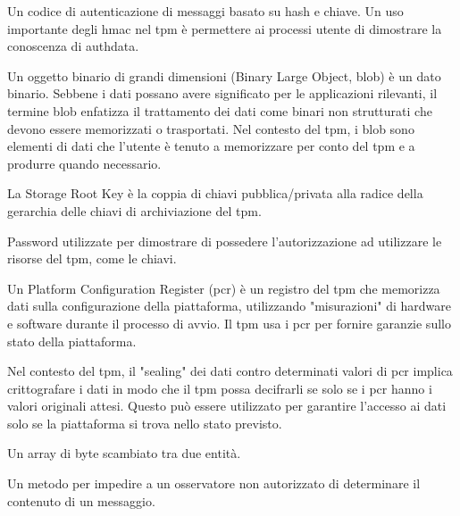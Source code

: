 \begin{description}[itemsep=2.5ex, parsep=0.5ex, leftmargin=2.5cm, style=nextline]
    \item[\textbf{\acrshort{hmac}}] Un codice di autenticazione di messaggi basato su hash e chiave. Un uso importante degli \acrshort{hmac} nel \acrshort{tpm} è permettere ai processi utente di dimostrare la conoscenza di authdata. 

    \item[\textbf{BLOB}] Un oggetto binario di grandi dimensioni (Binary Large Object, blob) è un dato binario. Sebbene i dati possano avere significato per le applicazioni rilevanti, il termine blob enfatizza il trattamento dei dati come binari non strutturati che devono essere memorizzati o trasportati. Nel contesto del \acrshort{tpm}, i blob sono elementi di dati che l'utente è tenuto a memorizzare per conto del \acrshort{tpm} e a produrre quando necessario.

    \item[\textbf{\acrshort{srk}}] La Storage Root Key è la coppia di chiavi pubblica/privata alla radice della gerarchia delle chiavi di archiviazione del \acrshort{tpm}. 

    \item[\textbf{Authdata}] Password utilizzate per dimostrare di possedere l'autorizzazione ad utilizzare le risorse del \acrshort{tpm}, come le chiavi.

    \item[\textbf{\acrshort{pcr}}] Un Platform Configuration Register (\acrshort{pcr}) è un registro del \acrshort{tpm} che memorizza dati sulla configurazione della piattaforma, utilizzando "misurazioni" di hardware e software durante il processo di avvio. Il \acrshort{tpm} usa i \acrshort{pcr} per fornire garanzie sullo stato della piattaforma.

    \item[\textbf{Seal}] Nel contesto del \acrshort{tpm}, il "sealing" dei dati contro determinati valori di \acrshort{pcr} implica crittografare i dati in modo che il \acrshort{tpm} possa decifrarli se solo se i \acrshort{pcr} hanno i valori originali attesi. Questo può essere utilizzato per garantire l’accesso ai dati solo se la piattaforma si trova nello stato previsto.

    \item[\textbf{Messaggio}] Un array di byte scambiato tra due entità.

    \item[\textbf{Segretezza}] Un metodo per impedire a un osservatore non autorizzato di determinare il contenuto di un messaggio.


\end{description}
